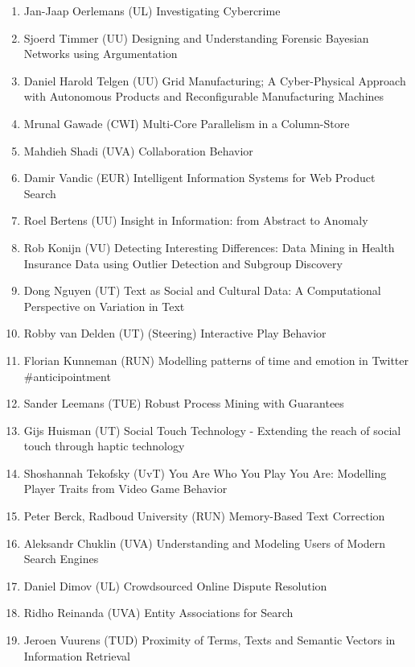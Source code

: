 \begin{multicols}{2}
\begin{scriptsize}
\vspace{0.2cm}
\begin{enumerate}[leftmargin=*,noitemsep,topsep=0pt,parsep=1pt,partopsep=0pt]
\renewcommand{\labelenumi}{2017-\arabic{enumi}}
\item Jan-Jaap Oerlemans (UL) Investigating Cybercrime
\item Sjoerd Timmer (UU) Designing and Understanding Forensic Bayesian Networks using Argumentation
\item Daniel Harold Telgen (UU) Grid Manufacturing; A Cyber-Physical Approach with Autonomous Products and Reconfigurable Manufacturing Machines
\item Mrunal Gawade (CWI) Multi-Core Parallelism in a Column-Store
\item Mahdieh Shadi (UVA) Collaboration Behavior 
\item Damir Vandic (EUR) Intelligent Information Systems for Web Product Search
\item Roel Bertens (UU) Insight in Information: from Abstract to Anomaly
\item Rob Konijn (VU) Detecting Interesting Differences: Data Mining in Health Insurance Data using Outlier Detection and Subgroup Discovery
\item Dong Nguyen (UT) Text as Social and Cultural Data: A Computational Perspective on Variation in Text
\item Robby van Delden (UT) (Steering) Interactive Play Behavior
\item Florian Kunneman (RUN) Modelling patterns of time and emotion in Twitter \#anticipointment
\item Sander Leemans (TUE) Robust Process Mining with Guarantees
\item Gijs Huisman (UT) Social Touch Technology - Extending the reach of social touch through haptic technology
\item Shoshannah Tekofsky (UvT) You Are Who You Play You Are: Modelling Player Traits from Video Game Behavior
\item Peter Berck, Radboud University (RUN) Memory-Based Text Correction
\item Aleksandr Chuklin (UVA) Understanding and Modeling Users of Modern Search Engines
\item Daniel Dimov (UL) Crowdsourced Online Dispute Resolution
\item Ridho Reinanda (UVA) Entity Associations for Search
\item Jeroen Vuurens (TUD) Proximity of Terms, Texts and Semantic Vectors in Information Retrieval

\end{enumerate}
\end{scriptsize}
\end{multicols}
